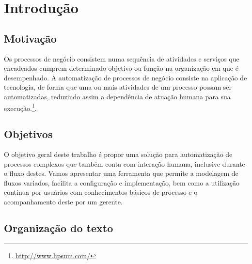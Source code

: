 \chapter{Introdução}\label{chp:LABEL_CHP_1}

\section{Motivação}\label{sec:LABEL_CHP_1_SEC_A}
Os processos de negócio consistem numa sequência de atividades e serviços que  encadeados cumprem determinado objetivo ou função na organização em que é desempenhado. A automatização de processos de negócio consiste na aplicação de tecnologia, de forma que uma ou mais atividades de um processo possam ser automatizadas, reduzindo assim a dependência de atuação humana para sua execução.\footnote{\url{http://www.lipsum.com/}}.

\section{Objetivos}\label{sec:LABEL_CHP_1_SEC_B}
O objetivo geral deste trabalho é propor uma solução para automatização de processos complexos que também conta com interação humana, inclusive durante o fluxo destes. Vamos apresentar uma ferramenta que permite a modelagem de fluxos variados, facilita a configuração e implementação, bem como a utilização contínua por usuários com conhecimentos básicos de processo e o acompanhamento deste por um gerente.

\section{Organização do texto}\label{sec:LABEL_CHP_1_SEC_C}

